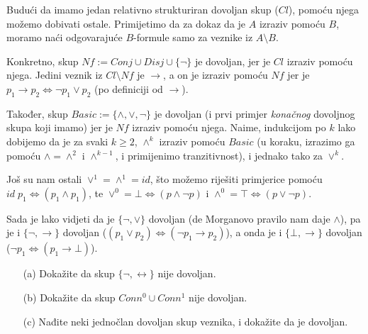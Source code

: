 Budući da imamo jedan relativno strukturiran dovoljan skup ($Cl$), po\-mo\-ću njega možemo dobivati ostale. Primijetimo da za dokaz da je $A$ izraziv pomoću $B$, moramo naći odgovarajuće $B$-formule samo za veznike iz $A\setminus B$. 

Konkretno, skup
$Nf:=Conj\cup Disj\cup\{\neg\}$ je dovoljan, jer je $Cl$ izraziv pomoću njega. Jedini veznik iz $Cl\setminus Nf$ je $\to$, a on je izraziv pomoću $Nf$ jer je
$p_1\to p_2\Leftrightarrow\neg p_1\vee p_2$ (po definiciji od $\to$).

Također, skup
$Basic:=\{\wedge, \vee, \neg\}$ je dovoljan (i prvi primjer \emph{konačnog} dovoljnog skupa koji imamo) jer je $Nf$ izraziv pomoću njega. Naime, indukcijom po $k$ lako dobijemo da je za svaki $k\ge 2$, $\wedge^k$ izraziv pomoću $Basic$ (u koraku, izrazimo ga pomoću $\wedge=\wedge^2$ i $\wedge^{k-1}$, i primijenimo tranzitivnost), i jednako tako za $\vee^k$.

Još su nam ostali $\vee^1=\wedge^1=id$, što možemo riješiti primjerice pomoću $id\; p_1\Leftrightarrow(p_1\wedge p_1)$, te $\vee^0=\bot\Leftrightarrow (p\wedge\neg p)$ i $\wedge^0=\top\Leftrightarrow(p\vee\neg p)$.

Sada je lako vidjeti da je
$\{\neg,\vee\}$ dovoljan (de Morganovo pravilo nam daje $\wedge$), pa je i $\{\neg, \to\}$ dovoljan ($(p_1\vee p_2)\Leftrightarrow(\neg p_1\to p_2)$), a onda je i $\{\bot,\to\}$ dovoljan ($\neg p_1\Leftrightarrow(p_1\to\bot)$).

\begin{zadatak}\begin{enumerate}
	\item[(a)] Dokažite da skup $\{\neg,\leftrightarrow\}$ nije dovoljan.
	\item[(b)] Dokažite da skup $Conn^0\cup Conn^1$ nije dovoljan.
	\item[(c)] Nađite neki jednočlan dovoljan skup veznika, i dokažite da je dovoljan.
\end{enumerate}
\end{zadatak}
